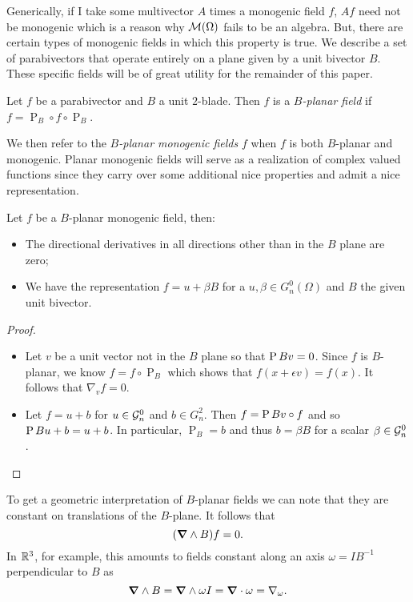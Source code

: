 Generically, if I take some multivector $A$ times a monogenic field $f$, $Af$ need not be monogenic which is a reason why $\mathcal{M}(\Omega)$ fails to be an algebra. But, there are certain types of monogenic fields in which this property is true. We describe a set of parabivectors that operate entirely on a plane given by a unit bivector $B$. These specific fields will be of great utility for the remainder of this paper.
\begin{definition}
    Let $f$ be a parabivector and $B$ a unit $2$-blade. Then $f$ is a \emph{$B$-planar field} if $f = \operatorname{P}_B \circ f \circ \operatorname{P}_B$.
\end{definition} 
We then refer to the \emph{$B$-planar monogenic fields} $f$ when $f$ is both $B$-planar and monogenic. Planar monogenic fields will serve as a realization of complex valued functions since they carry over some additional nice properties and admit a nice representation.
\begin{lemma}
    Let $f$ be a $B$-planar monogenic field, then:
\begin{itemize}
    \item The directional derivatives in all directions other than in the $B$ plane are zero;
    \item We have the representation $f=u+\beta B$ for a $u,\beta \in G_n^0(\Omega)$ and $B$ the given unit bivector.
\end{itemize}
\end{lemma}
\begin{proof}
~
    \begin{itemize}
    \item Let $v$ be a unit vector not in the $B$ plane so that $\operatorname{P}{B}{v}=0$. Since $f$ is $B$-planar, we know $f=f \circ \operatorname{P}_B$ which shows that $f(x+\epsilon v)= f(x)$.  It follows that $\nabla_v f=0$.
    \item Let $f=u+b$ for $u\in \mathcal{G}_n^0$ and $b\in G_n^2$. Then $f=\operatorname{P}{B}{v} \circ f$ and so $\operatorname{P}{B}{u+b}=u+b$. In particular, $\operatorname{P}_B=b$ and thus $b=\beta B$ for a scalar $\beta \in \mathcal{G}_n^0$.
\end{itemize}
\end{proof}
To get a geometric interpretation of $B$-planar fields we can note that they are constant on translations of the $B$-plane.  It follows that 
\begin{equation}
\label{eq:exterior_b_derivative}
(\boldsymbol{\nabla} \wedge B)f = 0.
\end{equation}
In $\mathbb{R}^3$, for example, this amounts to fields constant along an axis $\omega=IB^{-1}$ perpendicular to $B$ as
\begin{equation}
\label{eq:omega_axial_equivalence}
\boldsymbol{\nabla} \wedge B = \boldsymbol{\nabla} \wedge \omega I =\boldsymbol{\nabla} \cdot \omega = \nabla_\omega.
\end{equation}

